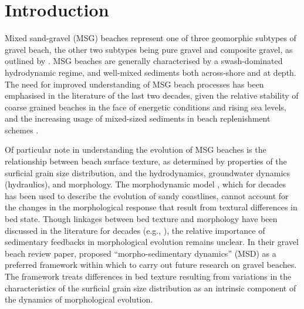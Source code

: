 \documentclass[jmse,article,submit,pdftex,moreauthors]{Definitions/mdpi}
\begin{document}


\section{Introduction}\label{Introduction}

Mixed sand-gravel (MSG) beaches represent one of three geomorphic subtypes of gravel beach, the other two subtypes being pure gravel and composite gravel, as outlined by \citet{Jennings_Shulmeister2002}. MSG beaches are generally characterised by a swash-dominated hydrodynamic regime, and well-mixed sediments both across-shore and at depth. The need for improved understanding of MSG beach processes has been emphasised in the literature of the last two decades, given the relative stability of coarse grained beaches in the face of energetic conditions and rising sea levels, and the increasing usage of mixed-sized sediments in beach replenishment schemes \citep{Mason_Coates2001}. 


Of particular note in understanding the evolution of MSG beaches is the relationship between beach surface texture, as determined by properties of the surficial grain size distribution, and the hydrodynamics, groundwater dynamics (hydraulics), and morphology. The morphodynamic model \citep{Wright_Thom1977, Buscombe_Masselink2006}, which for decades has been used to describe the evolution of sandy coastlines, cannot account for the changes in the morphological response that result from textural differences in bed state. Though linkages between bed texture and morphology have been discussed in the literature for decades (e.g., \citep{LonguetHiggins_Parkin1962, Moss1962, Isla1993, Carter_Orford1993, Sherman_etal1993, Masselink_Li2001, Buscombe_Masselink2006, Masselink_etal2007, Austin_Buscombe2008, VanGaalen_etal2011, Guest_Hay2019}), the relative importance of sedimentary feedbacks in morphological evolution remains unclear. In their gravel beach review paper, \citet{Buscombe_Masselink2006} proposed ``morpho-sedimentary dynamics'' (MSD) as a preferred framework within which to carry out future research on gravel beaches. The framework treats differences in bed texture resulting from variations in the characteristics of the surficial grain size distribution as an intrinsic component of the dynamics of morphological evolution. 
\end{document}
